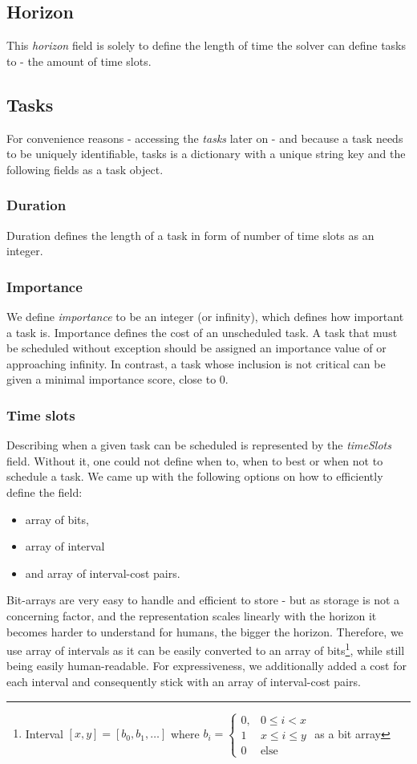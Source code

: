 \subsection*{Horizon}
This \textit{horizon} field is solely to define the length of time the solver can define tasks to - the amount of time slots.

\subsection*{Tasks}
For convenience reasons - accessing the \textit{tasks} later on - and because a task needs to be uniquely identifiable, tasks is a dictionary with a unique string key and the following fields as a task object.
\subsubsection*{Duration}
Duration defines the length of a task in form of number of time slots as an integer.

\subsubsection*{Importance}
\label{subsubsec:data-format:importance}
We define \textit{importance} to be an integer (or infinity), which defines how important a task is. Importance defines the cost of an unscheduled task. A task that must be scheduled without exception should be assigned an importance value of or approaching infinity. In contrast, a task whose inclusion is not critical can be given a minimal importance score, close to 0.

\subsubsection{Time slots}
\label{subsubsec:data-format:time-slots}
Describing when a given task can be scheduled is represented by the \textit{timeSlots} field. Without it, one could not define when to, when to best or when not to schedule a task. We came up with the following options on how to efficiently define the field:
\begin{itemize}
    \item array of bits,
    \item array of interval
    \item and array of interval-cost pairs.
\end{itemize}
Bit-arrays are very easy to handle and efficient to store - but as storage is not a concerning factor, and the representation scales linearly with the horizon it becomes harder to understand for humans, the bigger the horizon. Therefore, we use array of intervals as it can be easily converted to an array of bits\footnote{Interval $[x,y] = [b_0, b_1, \dots]$ where $b_i = \begin{cases}0, & 0 \leq i < x\\ 1 & x \leq i \leq y\\ 0 & \text{else}\end{cases}$ as a bit array}, while still being easily human-readable. For expressiveness, we additionally added a cost for each interval and consequently stick with an array of interval-cost pairs.

